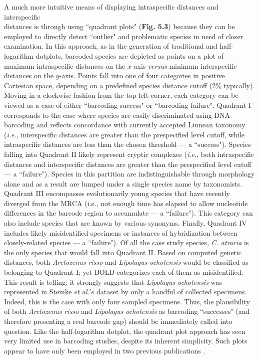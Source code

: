 A much more intuitive means of displaying intraspecific distances and interspecific \\ distances is through using ``quadrant plots" (\textbf{Fig. 5.3}) because they can be employed to directly detect ``outlier" and problematic species in need of closer examination. In this approach, as in the generation of traditional and half-logarithm dotplots, barcoded species are depicted as points on a plot of maximum intraspecific distances on the $x$-axis \textit{versus} minimum interspecific distances on the $y$-axis. Points fall into one of four categories in positive Cartesian space, depending on a predefined species distance cutoff (2\% typically). Moving in a clockwise fashion from the top left corner, each category can be viewed as a case of either ``barcoding success" or ``barcoding failure". Quadrant I corresponds to the case where species are easily discriminated using DNA barcoding and reflects concordance with currently accepted Linnean taxonomy (\textit{i.e.}, interspecific distances are greater than the prespecified level cutoff, while intraspecific distances are less than the chosen threshold --- a ``success"). Species falling into Quadrant II likely represent cryptic complexes (\textit{i.e.}, both intraspecific distances and interspecific distances are greater than the prespecified level cutoff --- a ``failure"). Species in this partition are indistinguishable through morphology alone and as a result are lumped under a single species name by taxonomists. Quadrant III encompasses evolutionarily young species that have recently diverged from the MRCA (i.e., not enough time has elapsed to allow nucleotide differences in the barcode region to accumulate --- a ``failure"). This category can also include species that are known by various synonyms. Finally, Quadrant IV includes likely misidentified specimens or instances of hybridization between closely-related species --- a ``failure"). Of all the case study species, \textit{C. atraria} is the only species that would fall into Quadrant II. Based on computed genetic distances, both \textit{Arctozenus risso} and \textit{Lipolagus ochotensis} would be classified as belonging to Quadrant I; yet BOLD categorizes each of them as misidentified. This result is telling: it strongly suggests that \textit{Lipolagus ochotensis} was represented in Steinke \textit{et al.}'s \cite{steinke2009dna} dataset by only a handful of collected specimens. Indeed, this is the case with only four sampled specimens. Thus, the plausibility of both \textit{Arctozenus risso} and \textit{Lipolagus ochotensis} as barcoding ``successes" (and therefore presenting a real barcode gap) should be immediately called into question. Like the half-logarithm dotplot, the quadrant plot approach has seen very limited use in barcoding studies, despite its inherent simplicity. Such plots appear to have only been employed in two previous publications \cite{hebert2004identification, hubert2015dna}. 


